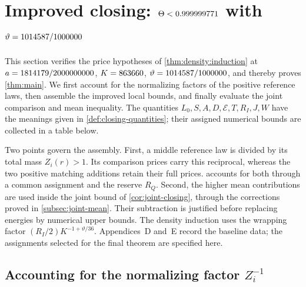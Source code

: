 \section{Improved closing: \texorpdfstring{$\Theta<0.999999771$}{Theta<\FourRoutesTheta} with \texorpdfstring{$\vartheta=1014587/1000000$}{vartheta=\FourRoutesDensity}}
\label{sec:four-routes-closing}

This section verifies the price hypotheses of
\cref{thm:density:induction} at
$a=1814179/2000000000$, $K=863660$,
$\vartheta=1014587/1000000$, and thereby proves
\cref{thm:main}. We first account for the normalizing factors of
the positive reference laws, then assemble the improved local bounds,
and finally evaluate the joint comparison and mean inequality.
The quantities $L_0,S,A,D,\mathcal E,T,R_I,J,W$ have the meanings
given in \cref{def:closing-quantities}; their assigned numerical
bounds are collected in a table below.

Two points govern the assembly. First, a middle reference law is
divided by its total mass $Z_i(r)>1$. Its comparison prices carry
this reciprocal, whereas the two positive matching additions retain
their full prices.  accounts for
both through a common assignment and the reserve $R_Q$. Second,
the higher mean contributions are used inside the joint bound of
\cref{cor:joint-closing}, through the corrections proved in
\cref{subsec:joint-mean}. Their subtraction is justified before
replacing energies by numerical upper bounds.
The density induction uses the wrapping factor
$(R_I/2)K^{-1+\vartheta/36}$.
Appendices~D and~E record the baseline data; the assignments selected
for the final theorem are specified here.

\subsection{Accounting for the normalizing factor \texorpdfstring{$Z_i^{-1}$}{Z\_i\textasciicircum (-1)}}


